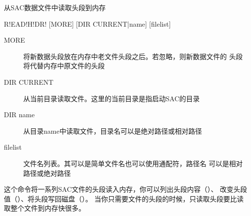 \label{cmd:readhdr}

从SAC数据文件中读取头段到内存

\begin{SACSTX}
R!EAD!H!DR! [MORE] [DIR CURRENT|name] [filelist]
\end{SACSTX}

\begin{description}
\item [MORE] 将新数据头段放在内存中老文件头段之后。若忽略，则新数据文件的
    头段将代替内存中原文件的头段
\item [DIR CURRENT] 从当前目录读取文件。这里的当前目录是指启动SAC的目录
\item [DIR name] 从目录name中读取文件，目录名可以是绝对路径或相对路径
\item [filelist] 文件名列表。其可以是简单文件名也可以使用通配符，路径名
    可以是相对路径或绝对路径
\end{description}

这个命令将一系列SAC文件的头段读入内存，你可以列出头段内容（）、
改变头段值（）、将头段写回磁盘（）。
当你只需要文件的头段的时候，只读取头段要比读取整个文件到内存快很多。
